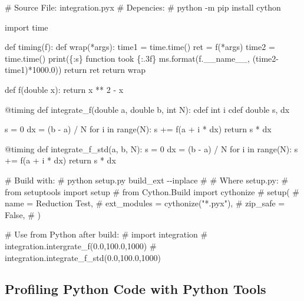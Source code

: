 \documentclass[
]{article}
\newenvironment{Shaded}{}{}
\newcommand{\NormalTok}[1]{#1}
\begin{document}
\begin{Shaded}
\begin{Highlighting}[]
\NormalTok{\# Source File: integration.pyx }
\NormalTok{\# Depencies:}
\NormalTok{\#  python {-}m pip install cython}

\NormalTok{import time}

\NormalTok{def timing(f):}
\NormalTok{    def wrap(*args):}
\NormalTok{        time1 = time.time()}
\NormalTok{        ret = f(*args)}
\NormalTok{        time2 = time.time()}
\NormalTok{        print(\textquotesingle{}\{:s\} function took \{:.3f\} ms\textquotesingle{}.format(f.\_\_name\_\_, (time2{-}time1)*1000.0))}
\NormalTok{        return ret   }
\NormalTok{    return wrap  }

\NormalTok{def f(double x):     }
\NormalTok{    return x ** 2 {-} x  }

\NormalTok{@timing }
\NormalTok{def integrate\_f(double a, double b, int N):  }
\NormalTok{    cdef int i     }
\NormalTok{    cdef double s, dx}

\NormalTok{    s = 0    }
\NormalTok{    dx = (b {-} a) / N  }
\NormalTok{    for i in range(N):}
\NormalTok{        s += f(a + i * dx)}
\NormalTok{    return s * dx  }

\NormalTok{@timing }
\NormalTok{def integrate\_f\_std(a, b, N):     }
\NormalTok{    s = 0     }
\NormalTok{    dx = (b {-} a) / N   }
\NormalTok{    for i in range(N):    }
\NormalTok{        s += f(a + i * dx)  }
\NormalTok{    return s * dx}

\NormalTok{\# Build with:}
\NormalTok{\#   python setup.py build\_ext {-}{-}inplace}
\NormalTok{\#}
\NormalTok{\# Where setup.py:}
\NormalTok{\#  from setuptools import setup}
\NormalTok{\#  from Cython.Build import cythonize}
\NormalTok{\#  setup(}
\NormalTok{\#     name        = \textquotesingle{}Reduction Test\textquotesingle{},}
\NormalTok{\#      ext\_modules = cythonize("*.pyx"),}
\NormalTok{\#      zip\_safe    = False,}
\NormalTok{\#    )}

\NormalTok{\# Use from Python after build:}
\NormalTok{\#   import integration}
\NormalTok{\#   integration.intergrate\_f(0.0,100.0,1000)}
\NormalTok{\#   integration.integrate\_f\_std(0.0,100.0,1000)}
\end{Highlighting}
\end{Shaded}

\hypertarget{profiling-python-code-with-python-tools}{%
\subsection{Profiling Python Code with Python
Tools}\label{profiling-python-code-with-python-tools}}
\end{document}
